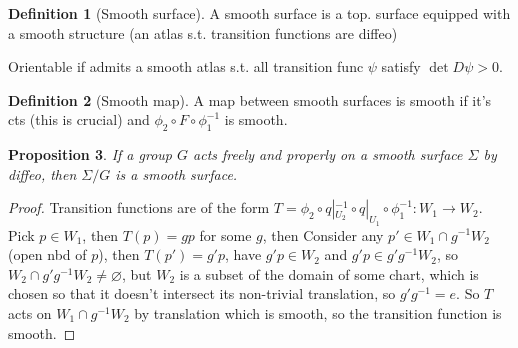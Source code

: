 \documentclass{article}
\theoremstyle{definition}
\newtheorem{defn}{Definition}[section]
\theoremstyle{remark}
\theoremstyle{plain}
\newtheorem{prop}[defn]{Proposition}
\theoremstyle{definition}
\begin{document}
\begin{defn}[Smooth surface]
    A smooth surface is a top. surface equipped with a smooth structure (an atlas s.t. transition functions are diffeo)

    Orientable if admits a smooth atlas s.t. all transition func $\psi$ satisfy $\det D\psi>0$.
\end{defn}
\begin{defn}[Smooth map]
    A map between smooth surfaces is smooth if it's cts (this is crucial) and $\phi_2\circ F\circ \phi_1^{-1}$ is smooth.
\end{defn}
\begin{prop}
    If a group $G$ acts freely and properly on a smooth surface $\Sigma$ by diffeo, then $\Sigma/G$ is a smooth surface.
\end{prop}
\begin{proof}
    Transition functions are of the form $T=\phi_2\circ q|_{U_2}^{-1}\circ q|_{U_1}\circ\phi_1^{-1}:W_1\to W_2$. Pick $p\in W_1$, then $T(p)=gp$ for some $g$, then Consider any $p'\in W_1\cap g^{-1}W_2$ (open nbd of $p$), then $T(p')=g'p$, have $g'p\in W_2$ and $g'p\in g'g^{-1}W_2$, so $W_2\cap g'g^{-1}W_2\neq\varnothing$, but $W_2$ is a subset of the domain of some chart, which is chosen so that it doesn't intersect its non-trivial translation, so $g'g^{-1}=e$. So $T$ acts on $W_1\cap g^{-1}W_2$ by translation which is smooth, so the transition function is smooth.
\end{proof}
\end{document}
